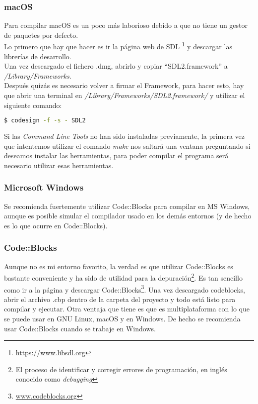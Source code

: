 \subsubsection{macOS}
Para compilar macOS es un poco más laborioso debido a que no tiene un gestor de paquetes por defecto.
\\ Lo primero que hay que hacer es ir la página web de SDL \footnote{\url{https://www.libsdl.org}} y descargar las librerías de desarrollo.
\\ Una vez descargado el fichero .dmg, abrirlo y copiar ``SDL2.framework'' a \textit{/Library/Frameworks}.
\\ Después quizás es necesario volver a firmar el Framework, para hacer esto, hay que abrir una terminal en \textit{/Library/Frameworks/SDL2.framework/} y utilizar el siguiente comando:
\begin{lstlisting}[language=bash]
  $ codesign -f -s - SDL2
\end{lstlisting}
Si las \textit{Command Line Tools} no han sido instaladas previamente, la primera vez que intentemos utilizar el comando \textit{make} nos saltará una ventana preguntando si deseamos instalar las herramientas, para poder compilar el programa será necesario utilizar esas herramientas.

\subsubsection{Microsoft Windows}
Se recomienda fuertemente utilizar Code::Blocks para compilar en MS Windows, aunque es posible simular el compilador usado en los demás entornos (y de hecho es lo que ocurre en Code::Blocks).

\subsubsection{Code::Blocks}
Aunque no es mi entorno favorito, la verdad es que utilizar Code::Blocks es bastante conveniente y ha sido de utilidad para la depuración\footnote{El proceso de identificar y corregir errores de programación, en inglés conocido como \textit{debugging}}. Es tan sencillo como ir a la página y descargar Code::Blocks\footnote{\url{www.codeblocks.org}}. Una vez descargado codeblocks, abrir el archivo .cbp dentro de la carpeta del proyecto y todo está listo para compilar y ejecutar. Otra ventaja que tiene es que es multiplataforma con lo que se puede usar en GNU Linux, macOS y en Windows. De hecho se recomienda usar Code::Blocks cuando se trabaje en Windows.

